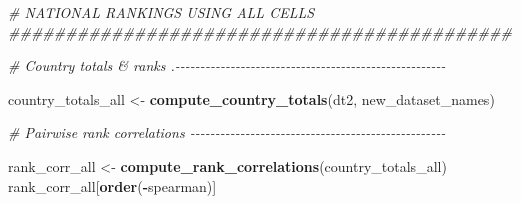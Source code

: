 \documentclass[
  11pt,
]{article}
\newenvironment{Shaded}{\begin{snugshade}}{\end{snugshade}}
\newcommand{\CommentTok}[1]{\textcolor[rgb]{0.56,0.35,0.01}{\textit{#1}}}
\newcommand{\FunctionTok}[1]{\textcolor[rgb]{0.13,0.29,0.53}{\textbf{#1}}}
\newcommand{\NormalTok}[1]{#1}
\newcommand{\OtherTok}[1]{\textcolor[rgb]{0.56,0.35,0.01}{#1}}
\newcommand{\SpecialCharTok}[1]{\textcolor[rgb]{0.81,0.36,0.00}{\textbf{#1}}}
\begin{document}
\begin{Shaded}
\begin{Highlighting}[]
\CommentTok{\# NATIONAL RANKINGS USING ALL CELLS \#\#\#\#\#\#\#\#\#\#\#\#\#\#\#\#\#\#\#\#\#\#\#\#\#\#\#\#\#\#\#\#\#\#\#\#\#\#\#\#\#\#\#\#}

\CommentTok{\# Country totals \& ranks .{-}{-}{-}{-}{-}{-}{-}{-}{-}{-}{-}{-}{-}{-}{-}{-}{-}{-}{-}{-}{-}{-}{-}{-}{-}{-}{-}{-}{-}{-}{-}{-}{-}{-}{-}{-}{-}{-}{-}{-}{-}{-}{-}{-}{-}{-}{-}{-}{-}{-}{-}{-}{-}{-}}

\NormalTok{country\_totals\_all }\OtherTok{\textless{}{-}} \FunctionTok{compute\_country\_totals}\NormalTok{(dt2, new\_dataset\_names)}

\CommentTok{\# Pairwise rank correlations {-}{-}{-}{-}{-}{-}{-}{-}{-}{-}{-}{-}{-}{-}{-}{-}{-}{-}{-}{-}{-}{-}{-}{-}{-}{-}{-}{-}{-}{-}{-}{-}{-}{-}{-}{-}{-}{-}{-}{-}{-}{-}{-}{-}{-}{-}{-}{-}{-}{-}{-}}

\NormalTok{rank\_corr\_all }\OtherTok{\textless{}{-}} \FunctionTok{compute\_rank\_correlations}\NormalTok{(country\_totals\_all)}
\NormalTok{rank\_corr\_all[}\FunctionTok{order}\NormalTok{(}\SpecialCharTok{{-}}\NormalTok{spearman)]}
\end{Highlighting}
\end{Shaded}
\end{document}

